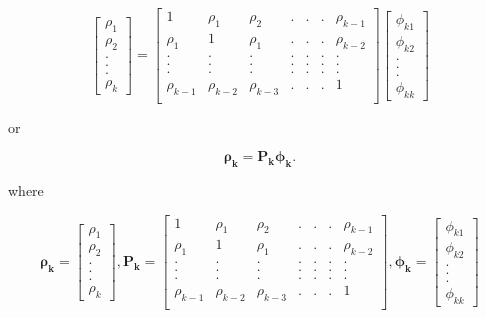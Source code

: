 \documentclass[11pt,a4paper,]{article}
\begin{document}
{\begin{equation}
\label{eq:pacf}
\left[\begin{array}
{r}
\rho_1  \\
\rho_2  \\
.\\
.\\
.\\
\rho_k
\end{array}\right] = \left[\begin{array}
{rrrrrrr}
1 & \rho_1 & \rho_2 & .&.&.& \rho_{k-1} \\
\rho_1 & 1 & \rho_1 & .&.&.& \rho_{k-2} \\
. & . & . & .&.&.& . \\
. & . & . & .&.&.& . \\
. & . & . & .&.&.& . \\
\rho_{k-1} & \rho_{k-2} & \rho_{k-3} & .&.&.& 1 \\
\end{array}\right] \left[\begin{array}
{r}
\phi_{k1}  \\
\phi_{k2}  \\
.\\
.\\
.\\
\phi_{kk}
\end{array}\right]
\end{equation}

or 


$$\bm{\rho_k}=\bm{P_k\phi_k}.$$

where

$$\bm{\rho_k} = \left[\begin{array}
{r}
\rho_1  \\
\rho_2  \\
.\\
.\\
.\\
\rho_k
\end{array}\right], \bm{P_k} =\left[\begin{array}
{rrrrrrr}
1 & \rho_1 & \rho_2 & .&.&.& \rho_{k-1} \\
\rho_1 & 1 & \rho_1 & .&.&.& \rho_{k-2} \\
. & . & . & .&.&.& . \\
. & . & . & .&.&.& . \\
. & . & . & .&.&.& . \\
\rho_{k-1} & \rho_{k-2} & \rho_{k-3} & .&.&.& 1 \\
\end{array}\right], \bm{\phi_k} = \left[\begin{array}
{r}
\phi_{k1}  \\
\phi_{k2}  \\
.\\
.\\
.\\
\phi_{kk}
\end{array}\right]$$


}
\end{document}
